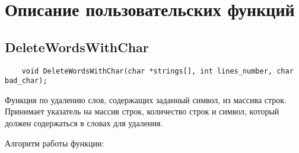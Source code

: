 \section*{Описание пользовательских функций}

\subsection*{DeleteWordsWithChar}

\begin{lstlisting}
	void DeleteWordsWithChar(char *strings[], int lines_number, char bad_char);
\end{lstlisting}

Функция по удалению слов, содержащих заданный символ, из массива строк. 
Принимает указатель на массив строк, 
количество строк и символ, который должен содержаться в словах для удаления.

Алгоритм работы функции:

